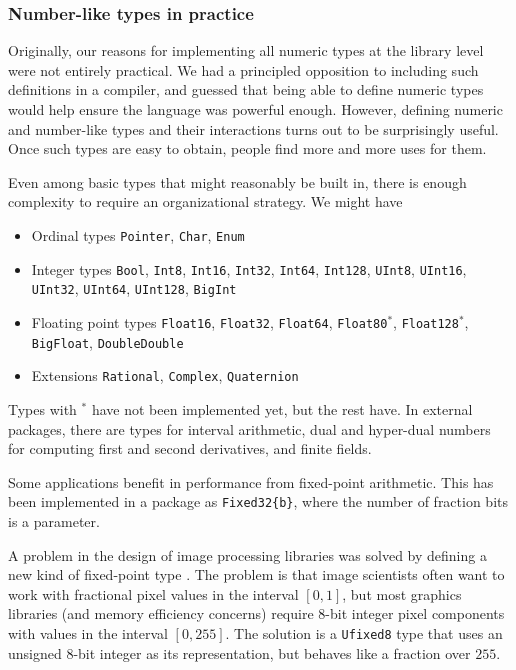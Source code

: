 \subsubsection{Number-like types in practice}

Originally, our reasons for implementing all numeric types at the library
level were not entirely practical.
We had a principled opposition to including such definitions in a compiler,
and guessed that being able to define numeric types would help ensure the
language was powerful enough.
However, defining numeric and number-like types and their interactions turns
out to be surprisingly useful.
Once such types are easy to obtain, people find more and more uses for them.

Even among basic types that might reasonably be built in, there is enough
complexity to require an organizational strategy.
We might have

\begin{itemize}
  \item Ordinal types \texttt{Pointer}, \texttt{Char}, \texttt{Enum}

  \item Integer types \texttt{Bool}, \texttt{Int8}, \texttt{Int16}, \texttt{Int32}, \texttt{Int64}, \texttt{Int128}, \texttt{UInt8}, \texttt{UInt16}, \texttt{UInt32}, \texttt{UInt64}, \texttt{UInt128}, \texttt{BigInt}

  \item Floating point types \texttt{Float16}, \texttt{Float32}, \texttt{Float64}, \texttt{Float80}$^*$, \texttt{Float128}$^*$, \texttt{BigFloat}, \texttt{DoubleDouble}

  \item Extensions \texttt{Rational}, \texttt{Complex}, \texttt{Quaternion}
\end{itemize}

\noindent
Types with $^*$ have not been implemented yet, but the rest have.
In external packages, there are types for interval arithmetic,
dual and hyper-dual numbers for computing first and second derivatives,
and finite fields.

Some applications benefit in performance from fixed-point arithmetic.
This has been implemented in a package as \texttt{Fixed32\{b\}}, where
the number of fraction bits is a parameter.

A problem in the design of image processing libraries was solved by
defining a new kind of fixed-point type \cite{ufixed}.
The problem is that image scientists often want to work with fractional
pixel values in the interval $[0,1]$, but most graphics libraries (and memory
efficiency concerns) require 8-bit integer pixel components with
values in the interval $[0,255]$.
The solution is a \texttt{Ufixed8} type that uses an unsigned 8-bit integer
as its representation, but behaves like a fraction over $255$.

